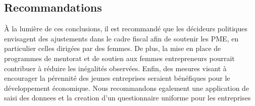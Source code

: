 \documentclass[a4paper,12pt]{report}
\begin{document}
\subsection{Recommandations}  
À la lumière de ces conclusions, il est recommandé que les décideurs politiques envisagent des ajustements dans le cadre fiscal afin de soutenir les PME, en particulier celles dirigées par des femmes. De plus, la mise en place de programmes de mentorat et de soutien aux femmes entrepreneurs pourrait contribuer à réduire les inégalités observées. Enfin, des mesures visant à encourager la pérennité des jeunes entreprises seraient bénéfiques pour le développement économique.
Nous recommandons egalement une application de saisi des donnees et la creation d'un questionnaire uniforme pour les entreprises



\end{document}
